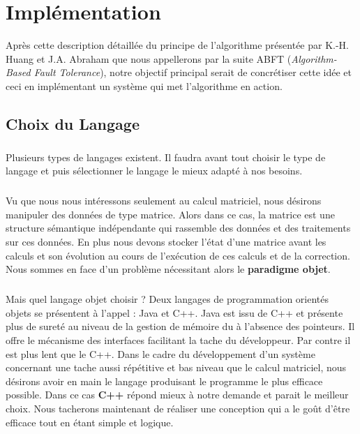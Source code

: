 \documentclass[a4paper, 10pt]{report}
\begin{document}
\chapter{Implémentation}
Après cette description détaillée du principe de l’algorithme présentée par K.-H. Huang et J.A. Abraham que nous 
appellerons par la suite ABFT (\textit{Algorithm-Based Fault Tolerance}), notre objectif principal serait de 
concrétiser cette idée et ceci en implémentant un système qui met l’algorithme en action.
\section{Choix du Langage}
\paragraph*{}
Plusieurs types de langages existent. Il faudra avant tout choisir le type de langage et puis sélectionner le langage 
le mieux adapté à nos besoins.
\paragraph*{}
Vu que nous nous intéressons seulement au calcul matriciel, nous désirons manipuler des données de type matrice. 
Alors dans ce cas, la matrice est une structure sémantique indépendante qui rassemble des données et des traitements 
sur ces données. En plus nous devons stocker l’état d’une matrice avant les calculs et son évolution au cours de 
l’exécution de ces calculs et de la correction. Nous sommes en face d’un problème nécessitant alors le \textbf{paradigme objet}.
\paragraph*{}
Mais quel langage objet choisir ? Deux langages de programmation orientés objets se présentent à l’appel : Java et C++. 
Java est issu de C++ et présente plus de sureté au niveau de la gestion de mémoire du à l’absence des pointeurs. 
Il offre le mécanisme des interfaces facilitant la tache du développeur. Par contre il est plus lent que le C++. 
Dans le cadre du développement d’un système concernant une tache aussi répétitive et bas niveau que le calcul matriciel, 
nous désirons avoir en main le langage produisant le programme le plus efficace possible. Dans ce cas \textbf{C++} répond mieux 
à notre demande et parait le meilleur choix. Nous tacherons maintenant de réaliser 
une conception qui a le goût d’être efficace tout en étant simple et logique.
\end{document}
